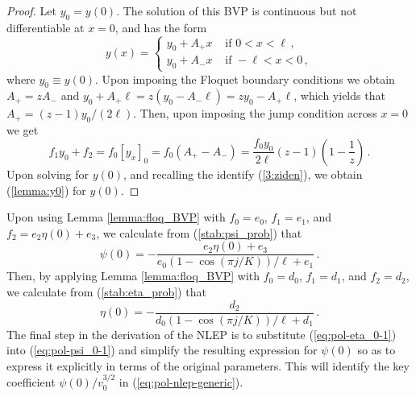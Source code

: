 \documentclass{article}%
\begin{document}
\begin{proof}
Let $y_{0}=y(0)$. The solution of this BVP is continuous but
not differentiable at $x=0$, and has the form
\[
y(x)=\begin{cases}
y_{0}+A_{+}x & \mbox{ if }0<x<\ell\,, \\
y_{0}+A_{-}x & \mbox{ if }-\ell<x<0\,,
\end{cases}
\]
where $y_0\equiv y(0)$.  Upon imposing the Floquet boundary conditions
we obtain $A_{+}=zA_{-}$ and
$y_{0}+A_{+}\ell=z\left(y_0-A_{-}\ell\right)= zy_{0}-A_{+}\ell$, which
yields that $A_{+}={(z-1)y_{0}/(2\ell)}$. Then, upon imposing the
jump condition across $x=0$ we get
\begin{equation*}
f_{1} y_0 +f_{2}  =  f_{0}\left[y_{x}\right]_{0} = f_{0}
 \left(A_{+}-A_{-}\right) = \frac{f_{0}y_{0}}{2\ell}
 \left(z-1\right)\left(1-\frac{1}{z}\right) \,.
\end{equation*}
Upon solving for $y(0)$, and recalling the identify (\ref{3:ziden}),
we obtain (\ref{lemma:y0}) for $y(0)$.
\end{proof}

Upon using Lemma \ref{lemma:floq_BVP} with $f_0=e_0$, $f_1=e_1$, and
$f_2=e_2\eta(0)+e_3$, we calculate from (\ref{stab:psi_prob}) that 
\begin{equation}
\psi(0)=-\frac{e_{2}\eta(0)+e_{3}}{e_{0}
{\left(1-\cos(\pi j/K)\right)/\ell}+e_{1}}\,. \label{eq:pol-psi_0-1}
\end{equation}
Then, by applying Lemma \ref{lemma:floq_BVP} with
$f_0=d_0$, $f_1=d_1$, and $f_2=d_2$, we calculate from
(\ref{stab:eta_prob}) that 
\begin{equation}
\eta(0)=-\frac{d_{2}}{d_{0}{\left(1-\cos(\pi j/K)\right)/\ell} +
d_{1}}\,. \label{eq:pol-eta_0-1}
\end{equation}
The final step in the derivation of the NLEP is to substitute
(\ref{eq:pol-eta_0-1}) into (\ref{eq:pol-psi_0-1}) and simplify the
resulting expression for $\psi(0)$ so as to express it explicitly in
terms of the original parameters. This will identify the key
coefficient ${\psi(0)/v_{0}^{3/2}}$ in (\ref{eq:pol-nlep-generic}).
\end{document}
